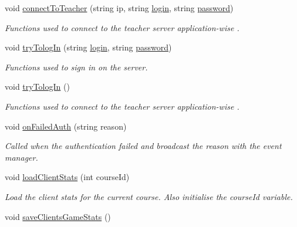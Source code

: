 \begin{DoxyCompactItemize}
\item 
void \hyperlink{class_c3_p_o_network_manager_ad927800dc6dd34c4bcb03cfbefda049f}{connect\-To\-Teacher} (string ip, string \hyperlink{class_c3_p_o_network_manager_a24278174f3f3777ab191c1d174dccd8f}{login}, string \hyperlink{class_c3_p_o_network_manager_af87fc918b29f6aed9fe932a9244e53ac}{password})
\begin{DoxyCompactList}\small\item\em Functions used to connect to the teacher server application-\/wise .\end{DoxyCompactList}\item 
void \hyperlink{class_c3_p_o_network_manager_aace6542fc83c5705a34b7a9db6d66819}{try\-Tolog\-In} (string \hyperlink{class_c3_p_o_network_manager_a24278174f3f3777ab191c1d174dccd8f}{login}, string \hyperlink{class_c3_p_o_network_manager_af87fc918b29f6aed9fe932a9244e53ac}{password})
\begin{DoxyCompactList}\small\item\em Functions used to sign in on the server.\end{DoxyCompactList}\item 
void \hyperlink{class_c3_p_o_network_manager_a133638de9fb32fc8d2cf9d5db805692c}{try\-Tolog\-In} ()
\begin{DoxyCompactList}\small\item\em Functions used to connect to the teacher server application-\/wise .\end{DoxyCompactList}\item 
void \hyperlink{class_c3_p_o_network_manager_aaa2126ad45ede934c23780375ce0604d}{on\-Failed\-Auth} (string reason)
\begin{DoxyCompactList}\small\item\em Called when the authentication failed and broadcast the reason with the event manager.\end{DoxyCompactList}\item 
void \hyperlink{class_c3_p_o_network_manager_ae02b97ba9d918673d50742baf4664f1c}{load\-Client\-Stats} (int course\-Id)
\begin{DoxyCompactList}\small\item\em Load the client stats for the current course. Also initialise the course\-Id variable.\end{DoxyCompactList}\item 
void \hyperlink{class_c3_p_o_network_manager_a01ff64266117fb6e1d7080beb7a1dffb}{save\-Clients\-Game\-Stats} ()

\end{DoxyCompactItemize}

